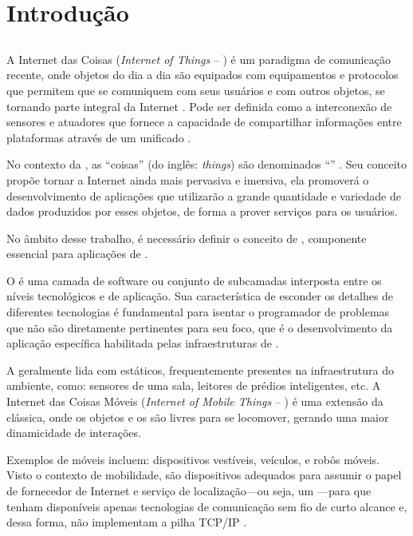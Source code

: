 \chapter{Introdução}

\section{\iot}

A Internet das Coisas (\textit{Internet of Things} -- \iot) é um paradigma de comunicação recente, onde objetos do dia a dia são equipados com equipamentos e protocolos que permitem que se comuniquem com seus usuários e com outros objetos, se tornando parte integral da Internet \cite{atzori:iera:morabito:2010}.  Pode ser definida como a interconexão de sensores e atuadores que fornece a capacidade de compartilhar informações entre plataformas através de um \framework unificado \cite{gubbi:et-al:2013}.

No contexto da \iot, as ``coisas'' (do inglês: \textit{things}) são denominados ``\smartobjs'' \cite{bandyopadhyay:sen:2011}. Seu conceito propõe tornar a Internet ainda mais pervasiva e imersiva, ela promoverá o desenvolvimento de aplicações que utilizarão a grande quantidade e variedade de dados produzidos por esses objetos, de forma a prover serviços para os usuários. 

No âmbito desse trabalho, é necessário definir o conceito de \middleware, componente essencial para aplicações de \iot.

\begin{citacao}
	O \middleware é uma camada de software ou conjunto de subcamadas interposta entre os níveis tecnológicos e de aplicação. Sua característica de esconder os detalhes de diferentes tecnologias é fundamental para isentar o programador de problemas que não são diretamente pertinentes para seu foco, que é o desenvolvimento da aplicação específica habilitada pelas infraestruturas de \iot \cite[tradução~nossa]{atzori:iera:morabito:2010}.
\end{citacao}


A \iot geralmente lida com \smartobjs estáticos, frequentemente presentes na infraestrutura do ambiente, como: sensores de uma sala, leitores \rfid de prédios inteligentes, etc. A Internet das Coisas Móveis (\textit{Internet of Mobile Things} -- \iomt) é uma extensão da \iot clássica, onde os objetos e os \gateways são livres para se locomover, gerando uma maior dinamicidade de interações.

Exemplos de \smartobjs móveis incluem: dispositivos vestíveis, veículos, e robôs móveis. Visto o contexto de mobilidade, \smartphones são dispositivos adequados para assumir o papel de fornecedor de Internet e serviço de localização---ou seja, um \gateway---para \smartobjs que tenham disponíveis apenas tecnologias de comunicação sem fio de curto alcance e, dessa forma, não implementam a pilha TCP/IP \cite{talavera:et-al:2015}.


